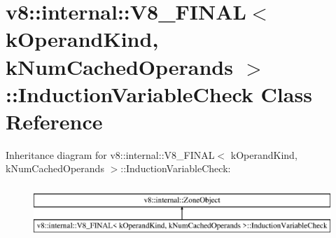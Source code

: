 \hypertarget{classv8_1_1internal_1_1_v8___f_i_n_a_l_1_1_induction_variable_check}{}\section{v8\+:\+:internal\+:\+:V8\+\_\+\+F\+I\+N\+A\+L$<$ k\+Operand\+Kind, k\+Num\+Cached\+Operands $>$\+:\+:Induction\+Variable\+Check Class Reference}
\label{classv8_1_1internal_1_1_v8___f_i_n_a_l_1_1_induction_variable_check}
Inheritance diagram for v8\+:\+:internal\+:\+:V8\+\_\+\+F\+I\+N\+A\+L$<$ k\+Operand\+Kind, k\+Num\+Cached\+Operands $>$\+:\+:Induction\+Variable\+Check\+:\begin{figure}[H]
\begin{center}
\leavevmode
\includegraphics[height=2.000000cm]{classv8_1_1internal_1_1_v8___f_i_n_a_l_1_1_induction_variable_check}
\end{center}
\end{figure}
